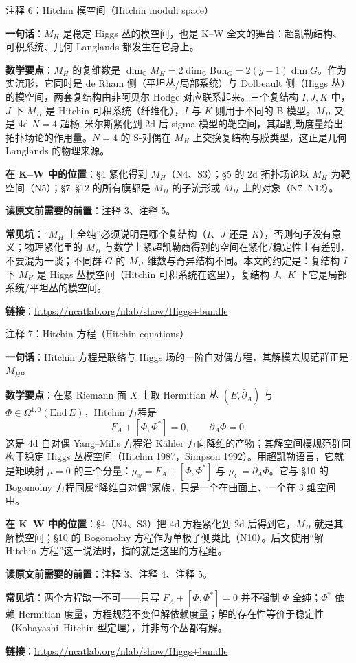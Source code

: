 \begin{kcard}{注释 6：Hitchin 模空间（Hitchin moduli space）}

\textbf{一句话}：$M_H$ 是稳定 Higgs 丛的模空间，也是 K--W 全文的舞台：超凯勒结构、可积系统、几何 Langlands 都发生在它身上。

\textbf{数学要点}：$M_H$ 的复维数是 $\dim_{\mathbb{C}}M_H=2\dim_{\mathbb{C}}\mathrm{Bun}_G=2(g-1)\dim G$。作为实流形，它同时是 de Rham 侧（平坦丛/局部系统）与 Dolbeault 侧（Higgs 丛）的模空间，两套复结构由非阿贝尔 Hodge 对应联系起来。三个复结构 $I,J,K$ 中，$J$ 下 $M_H$ 是 Hitchin 可积系统（纤维化），$I$ 与 $K$ 则用于不同的 B-模型。$M_H$ 又是 4d $N=4$ 超杨--米尔斯紧化到 2d 后 sigma 模型的靶空间，其超凯勒度量给出拓扑场论的作用量。$N=4$ 的 S-对偶在 $M_H$ 上交换复结构与膜类型，这正是几何 Langlands 的物理来源。

\textbf{在 K--W 中的位置}：§4 紧化得到 $M_H$（N4、S3）；§5 的 2d 拓扑场论以 $M_H$ 为靶空间（N5）；§7--§12 的所有膜都是 $M_H$ 的子流形或 $M_H$ 上的对象（N7--N12）。

\textbf{读原文前需要的前置}：注释 3、注释 5。

\textbf{常见坑}：“$M_H$ 上全纯”必须说明是哪个复结构（$I$、$J$ 还是 $K$），否则句子没有意义；物理紧化里的 $M_H$ 与数学上紧超凯勒商得到的空间在紧化/稳定性上有差别，不要混为一谈；不同群 $G$ 的 $M_H$ 维数与奇异结构不同。本文的约定是：复结构 $I$ 下 $M_H$ 是 Higgs 丛模空间（Hitchin 可积系统在这里），复结构 $J$、$K$ 下它是局部系统/平坦丛的模空间。

\noindent\textbf{链接}：\url{https://ncatlab.org/nlab/show/Higgs+bundle}
\end{kcard}

\begin{kcard}{注释 7：Hitchin 方程（Hitchin equations）}

\textbf{一句话}：Hitchin 方程是联络与 Higgs 场的一阶自对偶方程，其解模去规范群正是 $M_H$。

\textbf{数学要点}：在紧 Riemann 面 $X$ 上取 Hermitian 丛 $(E,\bar\partial_A)$ 与 $\Phi\in\Omega^{1,0}(\mathrm{End}\,E)$，Hitchin 方程是
\[
F_A+[\Phi,\Phi^*]=0,\qquad \bar\partial_A\Phi=0 .
\]
这是 4d 自对偶 Yang--Mills 方程沿 Kähler 方向降维的产物；其解空间模规范群同构于稳定 Higgs 丛模空间（Hitchin 1987，Simpson 1992）。用超凯勒语言，它就是矩映射 $\mu=0$ 的三个分量：$\mu_{\mathbb{R}}=F_A+[\Phi,\Phi^*]$ 与 $\mu_{\mathbb{C}}=\bar\partial_A\Phi$。它与 §10 的 Bogomolny 方程同属“降维自对偶”家族，只是一个在曲面上、一个在 3 维空间中。

\textbf{在 K--W 中的位置}：§4（N4、S3）把 4d 方程紧化到 2d 后得到它，$M_H$ 就是其解模空间；§10 的 Bogomolny 方程作为单极子侧类比（N10）。后文使用“解 Hitchin 方程”这一说法时，指的就是这里的方程组。

\textbf{读原文前需要的前置}：注释 3、注释 4、注释 5。

\textbf{常见坑}：两个方程缺一不可——只写 $F_A+[\Phi,\Phi^*]=0$ 并不强制 $\Phi$ 全纯；$\Phi^*$ 依赖 Hermitian 度量，方程规范不变但解依赖度量；解的存在性等价于稳定性（Kobayashi--Hitchin 型定理），并非每个丛都有解。

\noindent\textbf{链接}：\url{https://ncatlab.org/nlab/show/Higgs+bundle}
\end{kcard}

